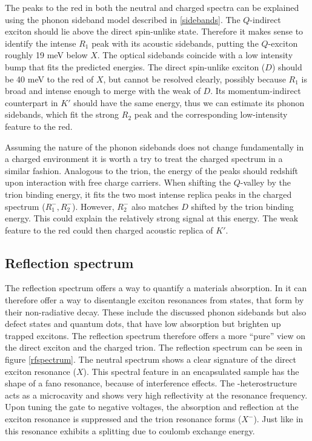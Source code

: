 The peaks to the red in both the neutral and charged spectra can be explained using the phonon sideband model described in \ref{sidebands}. The $Q$-indirect exciton should lie above the direct spin-unlike state. Therefore it makes sense to identify the intense $R_1$ peak with its acoustic sidebands, putting the $Q$-exciton roughly 19  meV below $X$. The optical sidebands coincide with a low intensity bump that fits the predicted energies. The direct spin-unlike exciton ($D$) should be 40 meV to the red of $X$, but cannot be resolved clearly, possibly because $R_1$ is broad and intense enough to merge with the weak \pl of $D$. Its momentum-indirect counterpart in $K'$ should have the same energy, thus we can estimate its phonon sidebands, which fit the strong $R_2$ peak and the corresponding low-intensity feature to the red.

Assuming the nature of the phonon sidebands does not change fundamentally in a charged environment it is worth a try to treat the charged spectrum in a similar fashion. Analogous to the trion, the energy of the peaks should redshift upon interaction with free charge carriers. When shifting the $Q$-valley by the trion binding energy, it fits the two most intense replica peaks in the charged spectrum ($R^-_1, R^-_2$). However, $R^-_2$ also matches $D$ shifted by the trion binding energy. This could explain the relatively strong signal at this energy. The weak feature to the red could then charged acoustic replica of $K'$. 

\subsection{Reflection spectrum}

The reflection spectrum offers a way to quantify a materials absorption. In \tmds it can therefore offer a way to disentangle exciton resonances from states, that form by their non-radiative decay. These include the discussed phonon sidebands but also defect states and quantum dots, that have low absorption but brighten up trapped excitons\cite{srivastava_optically_2015}. The reflection spectrum therefore offers a more ``pure'' view on the direct exciton and the charged trion.
The reflection spectrum can be seen in figure \ref{rfspectrum}. The neutral spectrum shows a clear signature of the direct exciton resonance ($X$). This spectral feature in an \hbng encapsulated sample has the shape of a fano resonance, because of interference effects. The \tmd-\hbng heterostructure acts as a microcavity and shows very high reflectivity at the resonance frequency\cite{scuri_large_2018}. Upon tuning the gate to negative voltages, the absorption and reflection at the exciton resonance is suppressed and the trion resonance forms ($X^-$). Just like in \pl this resonance exhibits a splitting due to coulomb exchange energy. 



